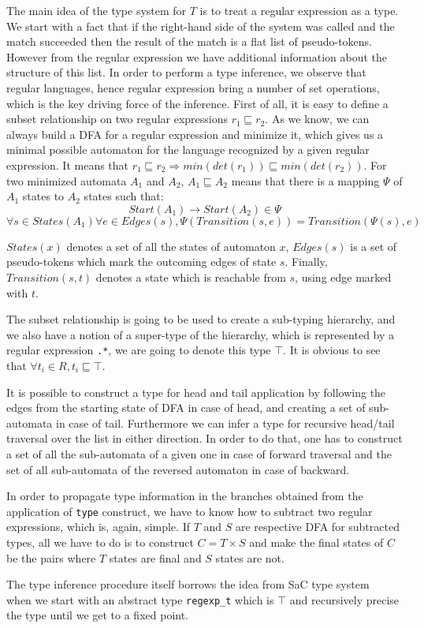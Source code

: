 The main idea of the type system for $T$ is to treat a regular
expression as a type.  We start with a fact that if the 
right-hand side of the system was called and the match succeeded
then the result of the match is a flat list of pseudo-tokens.
However from the regular expression we have additional information
about the structure of this list.  In order to perform a type 
inference, we observe that regular languages, hence regular 
expression bring a number of set operations, which is the key
driving force of the inference.  First of all, it is easy to
define a subset relationship on two regular expressions
$r_1 \sqsubseteq r_2$.  As we know, we can always build a DFA for
a regular expression and minimize it, which gives us a minimal
possible automaton for the language recognized by a given regular
expression.  It means that $r_1 \sqsubseteq r_2 \Rightarrow 
min (det (r_1)) \sqsubseteq min (det (r_2))$.  For two minimized 
automata $A_1$ and $A_2$, $A_1 \sqsubseteq A_2$ means that there
is a mapping $\Psi$ of $A_1$ states to $A_2$ states such that:
\[
    Start (A_1) \to Start (A_2) \in \Psi
\]
\[
    \forall s \in States (A_1) \forall e \in Edges (s),
    \Psi (Transition (s, e)) = Transition (\Psi (s), e)
\]

$States (x)$ denotes a set of all the states of automaton $x$,
$Edges (s)$ is a set of pseudo-tokens which mark the outcoming
edges of state $s$.  Finally, $Transition (s, t)$ denotes a
state which is reachable from $s$, using edge marked with $t$.

The subset relationship is going to be used to create a sub-typing
hierarchy, and we also have a notion of a super-type of
the hierarchy, which is represented by a regular expression \verb|.*|,
we are going to denote this type $\top$.  It is obvious to see that
$\forall t_i \in R, t_i \sqsubseteq \top$.

It is possible to construct a type for head and tail application
by following the edges from the starting state of DFA in case of
head, and creating a set of sub-automata in case of tail.
Furthermore we can infer a type for recursive head/tail traversal
over the list in either direction.  In order to do that, one has
to construct a set of all the sub-automata of a given one in 
case of forward traversal and the set of all sub-automata of
the reversed automaton in case of backward.

In order to propagate type information in the branches obtained from the
application of \verb|type| construct, we have to know how to subtract
two regular expressions, which is, again, simple.  If $T$ and $S$  are
respective DFA for subtracted types, all we have to do is to construct
$C = T \times S$ and make the final states of $C$ be the pairs where $T$
states are final and $S$ states are not. 

The type inference procedure itself borrows the idea from SaC type
system~\cite{} when we start with an abstract type \verb|regexp_t|
which is $\top$ and recursively precise the type until we get to
a fixed point.








